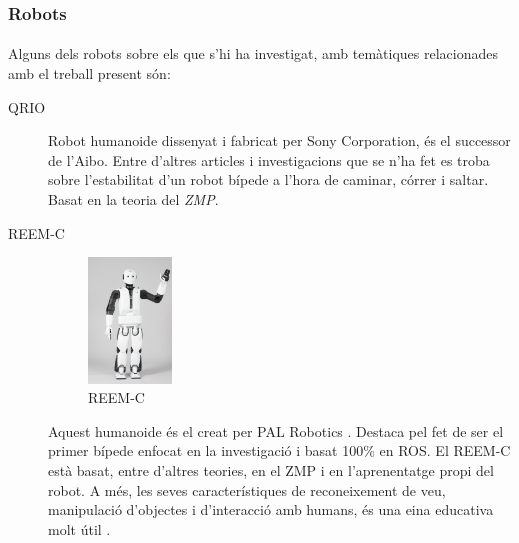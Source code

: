 \documentclass[12pt,a4paper,final,twoside]{article}
\begin{document}

\label{Robots}
\subsubsection{Robots}

\paragraph{}Alguns dels robots sobre els que s'hi ha investigat, amb temàtiques relacionades amb el treball present són:
\begin{description}
\item[QRIO]
\begin{minipage}[t]{0.94\linewidth}
Robot humanoide dissenyat i fabricat per Sony Corporation, és el successor de l'Aibo. Entre d'altres articles i investigacions que se n'ha fet es troba \cite{Nagasaka2004} sobre l'estabilitat d'un robot bípede a l'hora de caminar, córrer i saltar. Basat en la teoria del \textit{ZMP}.
\end{minipage}

\item[REEM-C]
\begin{minipage}[t]{0.94\linewidth}
	\begin{figure}
	    \centering
		\includegraphics[width=0.22\textwidth]{Imatges/REEM-C}
                \caption{REEM-C \cite{REEM_C}}
     \end{figure}
Aquest humanoide és el creat per PAL Robotics \cite{REEM_C}. Destaca pel fet de ser el primer bípede enfocat en la investigació i basat 100\% en ROS. El REEM-C està basat, entre d'altres teories, en el ZMP i en l'aprenentatge propi del robot. A més, les seves característiques de reconeixement de veu, manipulació d'objectes i d'interacció amb humans, és una eina educativa molt útil \cite{REEM_C}.
\end{minipage}


\end{description}
\end{document}
